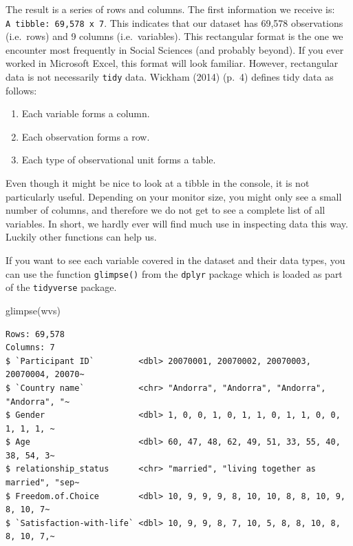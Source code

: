 \documentclass[
  letterpaper,
]{krantz}
\makeatletter
\newenvironment{Shaded}{\begin{snugshade}}{\end{snugshade}}
\newcommand{\FunctionTok}[1]{\textcolor[rgb]{0.28,0.35,0.67}{#1}}
\newcommand{\NormalTok}[1]{\textcolor[rgb]{0.00,0.23,0.31}{#1}}
\providecommand{\tightlist}{%
  \setlength{\itemsep}{0pt}\setlength{\parskip}{0pt}}\usepackage{longtable,booktabs,array}
\renewenvironment{quote}{\begin{VF}}{\end{VF}}
\newenvironment{kframe}{%
\medskip{}
\setlength{\fboxsep}{.8em}
 \def\at@end@of@kframe{}%
 \ifinner\ifhmode%
  \def\at@end@of@kframe{\end{minipage}}%
  \begin{minipage}{\columnwidth}%
 \fi\fi%
 \def\FrameCommand##1{\hskip\@totalleftmargin \hskip-\fboxsep
 \colorbox{shadecolor}{##1}\hskip-\fboxsep
     \hskip-\linewidth \hskip-\@totalleftmargin \hskip\columnwidth}%
 \MakeFramed {\advance\hsize-\width
   \@totalleftmargin\z@ \linewidth\hsize
   \@setminipage}}%
 {\par\unskip\endMakeFramed%
 \at@end@of@kframe}
\renewenvironment{Shaded}{\begin{kframe}}{\end{kframe}}
\makeatother
\begin{document}
The result is a series of rows and columns. The first information we
receive is: \texttt{A\ tibble:\ 69,578\ x\ 7}. This indicates that our
dataset has 69,578 observations (i.e.~rows) and 9 columns
(i.e.~variables). This rectangular format is the one we encounter most
frequently in Social Sciences (and probably beyond). If you ever worked
in Microsoft Excel, this format will look familiar. However, rectangular
data is not necessarily \texttt{tidy} data. Wickham (2014) (p.~4)
defines tidy data as follows:

\begin{quote}
\begin{enumerate}
\def\labelenumi{\arabic{enumi}.}
\tightlist
\item
  Each variable forms a column.
\item
  Each observation forms a row.
\item
  Each type of observational unit forms a table.
\end{enumerate}
\end{quote}

Even though it might be nice to look at a tibble in the console, it is
not particularly useful. Depending on your monitor size, you might only
see a small number of columns, and therefore we do not get to see a
complete list of all variables. In short, we hardly ever will find much
use in inspecting data this way. Luckily other functions can help us.

If you want to see each variable covered in the dataset and their data
types, you can use the function \texttt{glimpse()} from the
\texttt{dplyr} package which is loaded as part of the \texttt{tidyverse}
package.

\begin{Shaded}
\begin{Highlighting}[]
\FunctionTok{glimpse}\NormalTok{(wvs)}
\end{Highlighting}
\end{Shaded}

\begin{verbatim}
Rows: 69,578
Columns: 7
$ `Participant ID`         <dbl> 20070001, 20070002, 20070003, 20070004, 20070~
$ `Country name`           <chr> "Andorra", "Andorra", "Andorra", "Andorra", "~
$ Gender                   <dbl> 1, 0, 0, 1, 0, 1, 1, 0, 1, 1, 0, 0, 1, 1, 1, ~
$ Age                      <dbl> 60, 47, 48, 62, 49, 51, 33, 55, 40, 38, 54, 3~
$ relationship_status      <chr> "married", "living together as married", "sep~
$ Freedom.of.Choice        <dbl> 10, 9, 9, 9, 8, 10, 10, 8, 8, 10, 9, 8, 10, 7~
$ `Satisfaction-with-life` <dbl> 10, 9, 9, 8, 7, 10, 5, 8, 8, 10, 8, 8, 10, 7,~
\end{verbatim}
\end{document}
